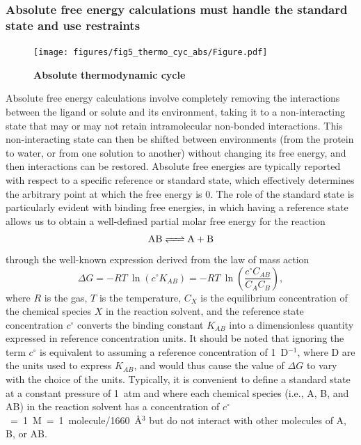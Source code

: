 \documentclass[9pt,bestpractices]{livecoms}
\begin{document}
\subsubsection{Absolute free energy calculations must handle the standard state and use restraints}
\label{sec:standardstate-restraints}
%
\begin{figure}
    \texttt{[image: figures/fig5\_thermo\_cyc\_abs/Figure.pdf]}
    \caption{\textbf{Absolute thermodynamic cycle}}
    \label{fig:fig_absolute_thermodynamic_cycle}
\end{figure}
%
Absolute free energy calculations involve completely removing the interactions between the ligand or solute and its environment, taking it to a non-interacting state that may or may not retain intramolecular non-bonded interactions.
This non-interacting state can then be shifted between environments (from the protein to water, or from one solution to another) without changing its free energy, and then interactions can be restored.
%
Absolute free energies are typically reported with respect to a specific reference or standard state, which effectively determines the arbitrary point at which the free energy is 0.
The role of the standard state is particularly evident with binding free energies, in which having a reference state allows us to obtain a well-defined partial molar free energy for the reaction
\begin{equation*}
\ce{AB <=> A + B}
\end{equation*}
through the well-known expression derived from the law of mass action
\begin{equation} \label{eq:DGfromKAB}
\Delta G = -RT ~ \ln \left( c^{\circ} K_{AB} \right)  = -RT ~ \ln\left( \frac{c^{\circ} C_{AB}}{C_A C_B} \right) ,
\end{equation}
where $R$ is the gas, $T$ is the temperature, $C_X$ is the equilibrium concentration of the chemical species $X$ in the reaction solvent, and the reference state concentration $c^{\circ}$ converts the binding constant $K_{AB}$ into a dimensionless quantity expressed in reference concentration units.
It should be noted that ignoring the term $c^{\circ}$ is equivalent to assuming a reference concentration of 1~D$^{-1}$, where D are the units used to express $K_{AB}$, and would thus cause the value of $\Delta G$ to vary with the choice of the units.
Typically, it is convenient to define a standard state at a constant pressure of 1~atm and where each chemical species (i.e., A, B, and AB) in the reaction solvent has a concentration of $c^{\circ}$~=~1~M~=~1~molecule/1660~\r{A}$^3$ but do not interact with other molecules of A, B, or AB.
%
\end{document}
